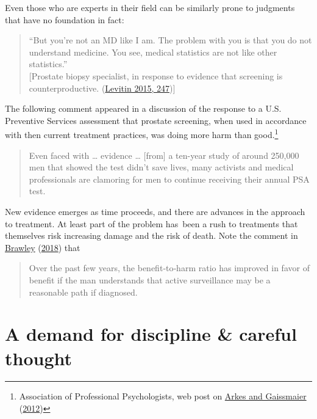 \documentclass[
  10pt,
  b5paper]{book}
\begin{document}
Even those who are experts in their field can be similarly prone to judgments
that have no foundation in fact:

\begin{quote}
``But you're not an MD like I am. The problem with you is that you
do not understand medicine. You see, medical statistics are not
like other statistics.''\\
{[}Prostate biopsy specialist, in response to evidence that screening
is counterproductive. (\protect\hyperlink{ref-levitin_2015}{Levitin 2015, 247}){]}
\end{quote}

The following comment appeared in a discussion of the response
to a U.S. Preventive Services assessment that prostate screening,
when used in accordance with then current treatment practices,
was doing more harm than good.\footnote{Association of Professional
  Psychologists, web post on \protect\hyperlink{ref-arkes2012psychological}{Arkes and Gaissmaier} (\protect\hyperlink{ref-arkes2012psychological}{2012})}

\begin{quote}
Even faced with \ldots{} evidence \ldots{} {[}from{]} a ten-year study of around 250,000 men that showed the test didn't save lives, many activists and medical professionals are clamoring for men to continue receiving their annual PSA test.
\end{quote}

New evidence emerges as time proceeds, and there are advances in the
approach to treatment. At least part of the problem has~been a rush
to treatments that themselves risk increasing damage and the risk of
death. Note the comment in \protect\hyperlink{ref-brawley2018prostate}{Brawley} (\protect\hyperlink{ref-brawley2018prostate}{2018}) that

\begin{quote}
Over the past few years, the benefit‐to‐harm ratio has
improved in favor of benefit if the man understands that
active surveillance may be a reasonable path if diagnosed.
\end{quote}

\hypertarget{a-demand-for-discipline-careful-thought}{%
\section{A demand for discipline \& careful thought}\label{a-demand-for-discipline-careful-thought}}
\end{document}
